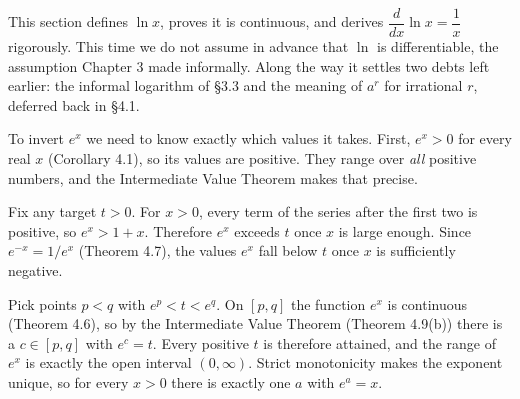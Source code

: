 \documentclass[a4paper,12pt,oneside]{memoir}
\begin{document}
This section defines \(\ln x\), proves it is continuous, and derives \(\dfrac{d}{dx}\ln x = \dfrac{1}{x}\) rigorously. This time we do not assume in advance that \(\ln\) is differentiable, the assumption Chapter 3 made informally. Along the way it settles two debts left earlier: the informal logarithm of §3.3 and the meaning of \(a^{r}\) for irrational \(r\), deferred back in §4.1.

To invert \(e^{x}\) we need to know exactly which values it takes. First, \(e^{x} > 0\) for every real \(x\) (Corollary 4.1), so its values are positive. They range over \emph{all} positive numbers, and the Intermediate Value Theorem makes that precise.

Fix any target \(t > 0\). For \(x > 0\), every term of the series after the first two is positive, so \(e^{x} > 1 + x\). Therefore \(e^{x}\) exceeds \(t\) once \(x\) is large enough. Since \(e^{-x} = 1/e^{x}\) (Theorem 4.7), the values \(e^{x}\) fall below \(t\) once \(x\) is sufficiently negative.

Pick points \(p < q\) with \(e^{p} < t < e^{q}\). On \([p, q]\) the function \(e^{x}\) is continuous (Theorem 4.6), so by the Intermediate Value Theorem (Theorem 4.9(b)) there is a \(c \in [p, q]\) with \(e^{c} = t\). Every positive \(t\) is therefore attained, and the range of \(e^{x}\) is exactly the open interval \((0, \infty)\). Strict monotonicity makes the exponent unique, so for every \(x > 0\) there is exactly one \(a\) with \(e^{a} = x\).
\end{document}
